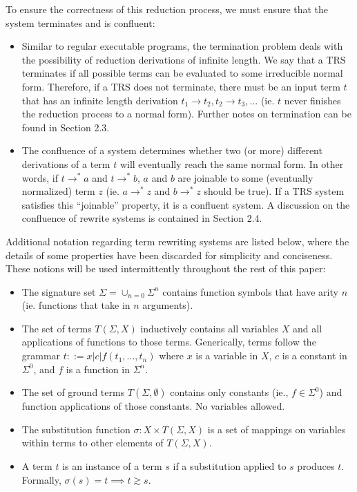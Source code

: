 \documentclass{article}
\begin{document}
To ensure the correctness of this reduction process,
we must ensure that the system terminates and is confluent:
\begin{itemize}
    \item
    Similar to regular executable programs, the termination problem deals with the possibility of reduction derivations of infinite length.
    We say that a TRS terminates if all possible terms can be evaluated to some irreducible normal form. Therefore, if a TRS does not terminate,
    there must be an input term $t$ that has an infinite length derivation $t_1 \rightarrow t_2, t_2 \rightarrow t_3, ...$
    (ie. $t$ never finishes the reduction process to a normal form).
    Further notes on termination can be found in Section 2.3.
    \item
    The confluence of a system determines whether two (or more) different derivations of a term $t$ will eventually reach the same normal form.
    In other words, if $t \rightarrow^* a$ and $t \rightarrow^* b$,
    $a$ and $b$ are joinable to some (eventually normalized) term $z$
    (ie. $a \rightarrow^* z$ and $b \rightarrow^* z$ should be true).
    If a TRS system satisfies this ``joinable'' property, it is a confluent system.
    A discussion on the confluence of rewrite systems is contained in Section 2.4.
\end{itemize}

Additional notation regarding term rewriting systems are listed below,
where the details of some properties have been discarded for simplicity and conciseness.
These notions will be used intermittently throughout the rest of this paper:
\begin{itemize}
    \item The signature set $\Sigma = \cup_{n=0}\Sigma^n$ contains function symbols that have arity $n$ (ie. functions that take in $n$ arguments).
    \item The set of terms $T(\Sigma, X)$ inductively contains all variables $X$ and all applications of functions to those terms.
    Generically, terms follow the grammar $t ::= x | c | f(t_1, ..., t_n)$ where $x$ is a variable in $X$, $c$ is a constant in $\Sigma^0$,
    and $f$ is a function in $\Sigma^n$.
    \item The set of ground terms $T(\Sigma, \emptyset)$ contains only constants (ie., $f \in \Sigma^0$) and function applications of those constants. No variables allowed.
    \item The substitution function $\sigma: X \times T(\Sigma, X)$ is a set of mappings on variables within terms to other elements of $T(\Sigma, X)$.
    \item A term $t$ is an instance of a term $s$ if a substitution applied to $s$ produces $t$. Formally, $\sigma(s) = t \implies t \gtrsim s$.
\end{itemize}
\end{document}
